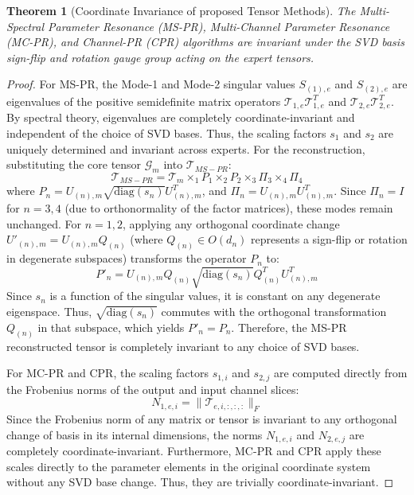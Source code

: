 \documentclass{article}
\theoremstyle{plain}
\newtheorem{theorem}{Theorem}[section]
\theoremstyle{definition}
\theoremstyle{remark}
\begin{document}
\begin{theorem}[Coordinate Invariance of proposed Tensor Methods]
The Multi-Spectral Parameter Resonance (MS-PR), Multi-Channel Parameter Resonance (MC-PR), and Channel-PR (CPR) algorithms are invariant under the SVD basis sign-flip and rotation gauge group acting on the expert tensors.
\end{theorem}
\begin{proof}
For MS-PR, the Mode-1 and Mode-2 singular values $S_{(1), e}$ and $S_{(2), e}$ are eigenvalues of the positive semidefinite matrix operators $\mathcal{T}_{1, e}\mathcal{T}_{1, e}^T$ and $\mathcal{T}_{2, e}\mathcal{T}_{2, e}^T$. By spectral theory, eigenvalues are completely coordinate-invariant and independent of the choice of SVD bases. Thus, the scaling factors $s_1$ and $s_2$ are uniquely determined and invariant across experts.
For the reconstruction, substituting the core tensor $\mathcal{G}_m$ into $\mathcal{T}_{MS-PR}$:
\begin{equation}
    \mathcal{T}_{MS-PR} = \mathcal{T}_m \times_1 P_1 \times_2 P_2 \times_3 \Pi_3 \times_4 \Pi_4
\end{equation}
where $P_n = U_{(n), m} \sqrt{\text{diag}(s_n)} U_{(n), m}^T$, and $\Pi_n = U_{(n), m} U_{(n), m}^T$. Since $\Pi_n = I$ for $n=3,4$ (due to orthonormality of the factor matrices), these modes remain unchanged.
For $n=1,2$, applying any orthogonal coordinate change $U'_{(n), m} = U_{(n), m} Q_{(n)}$ (where $Q_{(n)} \in O(d_n)$ represents a sign-flip or rotation in degenerate subspaces) transforms the operator $P_n$ to:
\begin{equation}
    P'_n = U_{(n), m} Q_{(n)} \sqrt{\text{diag}(s_n)} Q_{(n)}^T U_{(n), m}^T
\end{equation}
Since $s_n$ is a function of the singular values, it is constant on any degenerate eigenspace. Thus, $\sqrt{\text{diag}(s_n)}$ commutes with the orthogonal transformation $Q_{(n)}$ in that subspace, which yields $P'_n = P_n$. Therefore, the MS-PR reconstructed tensor is completely invariant to any choice of SVD bases.

For MC-PR and CPR, the scaling factors $s_{1, i}$ and $s_{2, j}$ are computed directly from the Frobenius norms of the output and input channel slices:
\begin{equation}
    N_{1, e, i} = \|\mathcal{T}_{e, i, :, :, :}\|_F
\end{equation}
Since the Frobenius norm of any matrix or tensor is invariant to any orthogonal change of basis in its internal dimensions, the norms $N_{1, e, i}$ and $N_{2, e, j}$ are completely coordinate-invariant. Furthermore, MC-PR and CPR apply these scales directly to the parameter elements in the original coordinate system without any SVD base change. Thus, they are trivially coordinate-invariant.
\end{proof}
\end{document}
